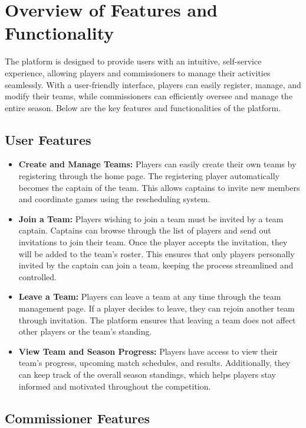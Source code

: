 \documentclass{article}
\begin{document}
\section{Overview of Features and Functionality}

The platform is designed to provide users with an intuitive, self-service experience, allowing players and commissioners to manage their activities seamlessly. With a user-friendly interface, players can easily register, manage, and modify their teams, while commissioners can efficiently oversee and manage the entire season. Below are the key features and functionalities of the platform.

\subsection{User Features}

\begin{itemize}
    \item \textbf{Create and Manage Teams:} Players can easily create their own teams by registering through the home page. The registering player automatically becomes the captain of the team. This allows captains to invite new members and coordinate games using the rescheduling system.
    \item \textbf{Join a Team:} Players wishing to join a team must be invited by a team captain. Captains can browse through the list of players and send out invitations to join their team. Once the player accepts the invitation, they will be added to the team’s roster. This ensures that only players personally invited by the captain can join a team, keeping the process streamlined and controlled.
    \item \textbf{Leave a Team:} Players can leave a team at any time through the team management page. If a player decides to leave, they can rejoin another team through invitation. The platform ensures that leaving a team does not affect other players or the team’s standing.
    \item \textbf{View Team and Season Progress:} Players have access to view their team’s progress, upcoming match schedules, and results. Additionally, they can keep track of the overall season standings, which helps players stay informed and motivated throughout the competition.
\end{itemize}

\subsection{Commissioner Features}
\end{document}
